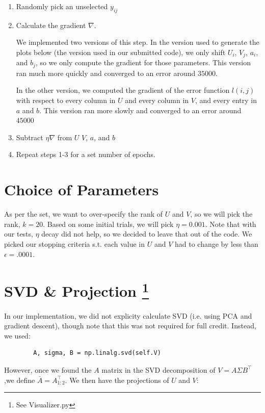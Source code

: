 \documentclass{article}
\begin{document}
\begin{enumerate}
    \item Randomly pick an unselected $y_{ij}$
    \item Calculate the gradient $\nabla$. 

    We implemented two versions of this step. In the version used to
    generate the plots below (the version used in our submitted code), 
    we only shift $U_i$, $V_j$, $a_i$, and $b_j$, so we only compute the 
    gradient for those parameters. This version ran much more quickly and converged
    to an error around $35000$.

    In the other version, we computed
    the gradient of the error function $l(i,j)$ with respect to every
    column in $U$ and every column in $V$, and every entry in $a$ and $b$.
    This version ran more slowly and converged to an error around $45000$

    \item Subtract $\eta \nabla$ from $U$ $V$, $a$, and $b$
    \item Repeat steps 1-3 for a set number of epochs.
\end{enumerate}


\section*{Choice of Parameters}
As per the set, we want to over-specify the rank of $U$ and $V$, so we will
pick the rank, $k = 20$. Based on some initial trials, we will pick $\eta = 0.001$.
Note that with our tests, $\eta$ decay did not help, so we decided to leave that
out of the code. We picked our stopping criteria s.t. each value in $U$ and $V$
had to change by less than $\epsilon = .0001$.

\section*{SVD \& Projection \footnote{See Visualizer.py}}
In our implementation, we did not explicity calculate SVD (i.e. using PCA and
gradient descent), though note that this was not required for full credit.
Instead, we used:

\begin{verbatim}
        A, sigma, B = np.linalg.svd(self.V)
\end{verbatim}

\noindent However, once we found the $A$ matrix in the SVD decomposition of $V = A
\Sigma B^{\intercal}$,we define $\bar{A} = A_{1:2}^{\intercal}$. We then have
the projections of $U$ and $V$:
\end{document}
